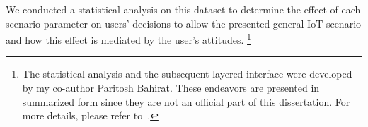 %
%
%
%

We conducted a statistical analysis on this dataset to determine the effect of each scenario parameter on users' decisions to allow the presented general IoT scenario and how this effect is mediated by the user's attitudes. \footnote{The statistical analysis and the subsequent layered interface were developed by my co-author Paritosh Bahirat. These endeavors are presented in summarized form since they are not an official part of this dissertation. For more details, please refer to~\cite{bahiratiui2018}.}

